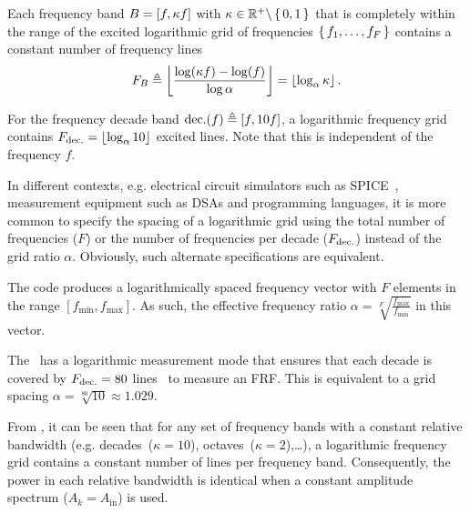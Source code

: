   \begin{property}\label{prop:excitation:log:relBW}
   Each frequency band $B = \left[ f, \kappa f \right]$ with $\kappa \in {\ensuremath{\mathbb{R}}}^{+} \backslash \set{0,1}$ that is completely within the range of the excited logarithmic grid of frequencies $\set{f_1, \ldots, f_F}$ contains a constant number of frequency lines
   \begin{equation}
     F_{B} \triangleq
     \left\lfloor \frac{\log (\kappa f) - \log( f )}{\log \alpha} \right\rfloor
         = \left\lfloor \log_{\alpha} \kappa \right\rfloor
         \text{.}
   \end{equation}
   \end{property}
  \begin{example}
    For the frequency decade band $\mathrm{dec.}(f) \triangleq \left[ f, 10 f \right]$, a logarithmic frequency grid contains $F_{\mathrm{dec.}} = \left\lfloor \log_{\alpha} 10 \right\rfloor$ excited lines.
    Note that this is independent of the frequency $f$.
  \end{example}
  \begin{remark}
    In different contexts, e.g. electrical circuit simulators such as \gls{SPICE}~\citep{Kundert1995}, measurement equipment such as \glspl{DSA} and programming languages, it is more common to specify the spacing of a logarithmic grid using the total number of frequencies ($F$) or the number of frequencies per decade ($F_{\mathrm{dec.}}$) instead of the grid ratio $\alpha$.
    Obviously, such alternate specifications are equivalent.
  \end{remark}
  \begin{example} \label{eg:excitation:logarithmicGrid:matlab}
    The \MATLAB code  produces a logarithmically spaced frequency vector  with $F$ elements in the range $\left[ f_{\min}, f_{\max} \right]$.
    As such, the effective frequency ratio $\alpha = \sqrt[F]{\frac{f_{\max}}{f_{\min}}}$ in this vector.
  \end{example}
  \begin{example}
    The~\citet{HP3562A} has a logarithmic measurement mode that ensures that each decade is covered by $F_{\mathrm{dec.}} = 80$ lines~ to measure an \gls{FRF}.
    This is equivalent to a grid spacing $\alpha = \sqrt[80]{10} \approx 1.029$.
  \end{example}

   From , it can be seen that for any set of frequency bands with a constant relative bandwidth (e.g. decades~($\kappa=10$), octaves~($\kappa=2$),\ldots ), a logarithmic  frequency grid contains a constant number of lines per frequency band.
   Consequently, the power in each relative bandwidth is identical when a constant amplitude spectrum ($A_k = A_{\mathrm{in}}$) is used.   

